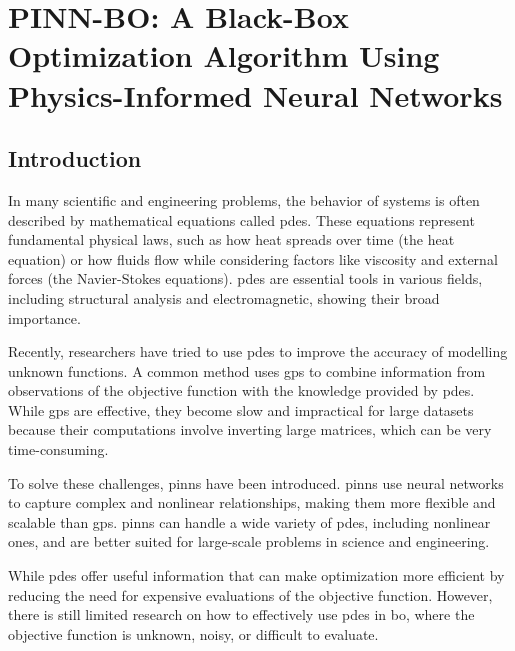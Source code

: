 \chapter{PINN-BO: A Black-Box Optimization
Algorithm Using Physics-Informed
Neural Networks} %
\label{chap:pinn-bo}
\section{Introduction}

In many scientific and engineering problems, the behavior of systems is often described by mathematical equations called \acfp{pde}. These equations represent fundamental physical laws, such as how heat spreads over time (the heat equation) or how fluids flow while considering factors like viscosity and external forces (the Navier-Stokes equations). \acp{pde} are essential tools in various fields, including structural analysis and electromagnetic, showing their broad importance.

Recently, researchers have tried to use \acp{pde} to improve the accuracy of modelling unknown functions. A common method uses \acp{gp} to combine information from observations of the objective function with the knowledge provided by \acp{pde}. While \acp{gp} are effective, they become slow and impractical for large datasets because their computations involve inverting large matrices, which can be very time-consuming.

To solve these challenges, \acfp{pinn} have been introduced. \acp{pinn} use neural networks to capture complex and nonlinear relationships, making them more flexible and scalable than \acp{gp}. \acp{pinn} can handle a wide variety of \acp{pde}, including nonlinear ones, and are better suited for large-scale problems in science and engineering.

While \acp{pde} offer useful information that can make optimization more efficient by reducing the need for expensive evaluations of the objective function. However, there is still limited research on how to effectively use \acp{pde} in \ac{bo}, where the objective function is unknown, noisy, or difficult to evaluate.

